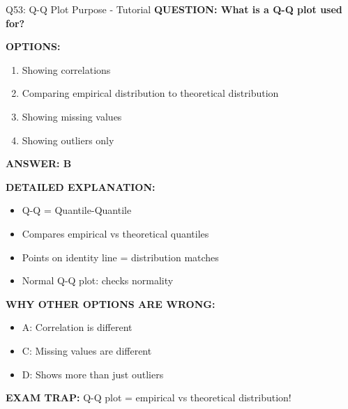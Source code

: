 \documentclass[8pt]{beamer}
\begin{document}
	\begin{frame}{Q53: Q-Q Plot Purpose - Tutorial}
		\fontsize{6.5}{7.5}\selectfont
		\textbf{QUESTION: What is a Q-Q plot used for?}
		
		\vspace{0.1cm}
		\textbf{OPTIONS:}
		\begin{enumerate}
			\item Showing correlations
			\item Comparing empirical distribution to theoretical distribution
			\item Showing missing values
			\item Showing outliers only
		\end{enumerate}
		
		\vspace{0.1cm}
		\textcolor{myblue}{\textbf{ANSWER: B}}
		
		\vspace{0.1cm}
		\textbf{DETAILED EXPLANATION:}
		\begin{itemize}
			\item Q-Q = Quantile-Quantile
			\item Compares empirical vs theoretical quantiles
			\item Points on identity line = distribution matches
			\item Normal Q-Q plot: checks normality
		\end{itemize}
		
		\vspace{0.1cm}
		\textcolor{myred}{\textbf{WHY OTHER OPTIONS ARE WRONG:}}
		\begin{itemize}
			\item \textcolor{myred}{A:} Correlation is different
			\item \textcolor{myred}{C:} Missing values are different
			\item \textcolor{myred}{D:} Shows more than just outliers
		\end{itemize}
		
		\textcolor{myred}{\textbf{EXAM TRAP:}} Q-Q plot = \textcolor{myblue}{empirical vs theoretical distribution}!
	\end{frame}
	
\end{document}
